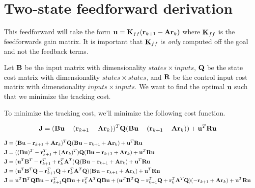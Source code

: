 \chapter{Two-state feedforward derivation} \label{ch:app-two-state-ff-deriv}

This feedforward will take the form
$\mathbf{u} = \mathbf{K}_{ff} (\mathbf{r}_{k+1} - \mathbf{A}\mathbf{r}_k)$ where
$\mathbf{K}_{ff}$ is the feedforwards gain matrix. It is important that
$\mathbf{K}_{ff}$ is \textit{only} computed off the goal and not the feedback
terms.

Let $\mathbf{B}$ be the input matrix with dimensionality $states \times inputs$,
$\mathbf{Q}$ be the state cost matrix with dimensionality
$states \times states$, and $\mathbf{R}$ be the control input cost matrix with
dimensionality $inputs \times inputs$. We want to find the optimal $\mathbf{u}$
such that we minimize the tracking cost.

To minimize the tracking cost, we'll minimize the following cost function.

\begin{equation*}
  \mathbf{J} = (\mathbf{B}\mathbf{u} - (\mathbf{r}_{k+1} - \mathbf{A}\mathbf{r}_k))^T \mathbf{Q}
    (\mathbf{B}\mathbf{u} - (\mathbf{r}_{k+1} - \mathbf{A}\mathbf{r}_k)) +
    \mathbf{u}^T\mathbf{R}\mathbf{u}
\end{equation*}

\begin{align*}
  \mathbf{J} &= (\mathbf{B}\mathbf{u} - \mathbf{r}_{k+1} + \mathbf{A}\mathbf{r}_k)^T \mathbf{Q}
    (\mathbf{B}\mathbf{u} - \mathbf{r}_{k+1} + \mathbf{A}\mathbf{r}_k) +
    \mathbf{u}^T\mathbf{R}\mathbf{u} \\
  \mathbf{J} &= ((\mathbf{B}\mathbf{u})^T - \mathbf{r}_{k+1}^T + (\mathbf{A}\mathbf{r}_k)^T)
    \mathbf{Q}(\mathbf{B}\mathbf{u} - \mathbf{r}_{k+1} + \mathbf{A}\mathbf{r}_k) +
    \mathbf{u}^T\mathbf{R}\mathbf{u} \\
  \mathbf{J} &= (\mathbf{u}^T\mathbf{B}^T - \mathbf{r}_{k+1}^T + \mathbf{r}_k^T\mathbf{A}^T)
    \mathbf{Q}(\mathbf{B}\mathbf{u} - \mathbf{r}_{k+1} + \mathbf{A}\mathbf{r}_k) +
    \mathbf{u}^T\mathbf{R}\mathbf{u} \\
  \mathbf{J} &= (\mathbf{u}^T\mathbf{B}^T\mathbf{Q} - \mathbf{r}_{k+1}^T\mathbf{Q} +
    \mathbf{r}_k^T\mathbf{A}^T\mathbf{Q})(\mathbf{B}\mathbf{u} - \mathbf{r}_{k+1} +
    \mathbf{A}\mathbf{r}_k) + \mathbf{u}^T\mathbf{R}\mathbf{u} \\
  \mathbf{J} &= \mathbf{u}^T\mathbf{B}^T\mathbf{Q}\mathbf{B}\mathbf{u} -
    \mathbf{r}_{k+1}^T\mathbf{Q}\mathbf{B}\mathbf{u} +
    \mathbf{r}_k^T\mathbf{A}^T\mathbf{Q}\mathbf{B}\mathbf{u} + (\mathbf{u}^T\mathbf{B}^T\mathbf{Q} -
    \mathbf{r}_{k+1}^T\mathbf{Q} + \mathbf{r}_k^T\mathbf{A}^T\mathbf{Q})
    (-\mathbf{r}_{k+1} + \mathbf{A}\mathbf{r}_k) + \mathbf{u}^T\mathbf{R}\mathbf{u}
\end{align*}

